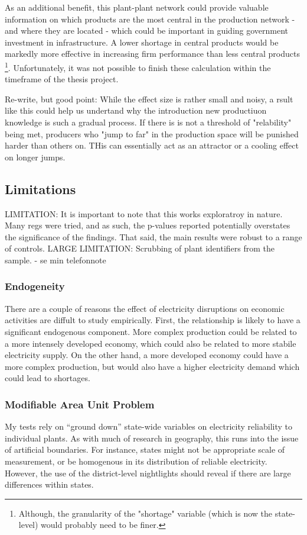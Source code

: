 \documentclass[11pt]{article}
\begin{document}
As an additional benefit, this plant-plant network could provide valuable information on which products are the most central in the production network - and where they are located - which could be important in guiding government investment in infrastructure. A lower shortage in central products would be markedly more effective in increasing firm performance than less central products \footnote{Although, the granularity of the "shortage" variable (which is now the state-level) would probably need to be finer.}. Unfortunately, it was not possible to finish these calculation within the timeframe of the thesis project.

Re-write, but good point:
While the effect size is rather small and noisy, a rsult like this could help us undertand why the introduction new productiuon knowledge is such a gradual process. If there is is not a threshold of "relability" being met, producers who "jump to far" in the production space will be punished harder than others on. THis can essentially act as an attractor or a cooling effect on longer jumps.

\subsection{Limitations}
\label{sec:org979560b}

LIMITATION: It is important to note that this works exploratroy in nature. Many regs were tried, and as such, the p-values reported potentially overstates the significance of the findings. That said, the main results were robust to a range of controls.
LARGE LIMITATION: Scrubbing of plant identifiers from the sample. - se min telefonnote

\subsubsection{Endogeneity}
\label{sec:orgd4457e7}
There are a couple of reasons the effect of electricity disruptions on economic activities are diffult to study empirically. First, the relationship is likely to have a significant endogenous component. More complex production could be related to a more intensely developed economy, which could also be related to more stabile electricity supply. On the other hand, a more developed economy could have a more complex production, but would also have a higher electricity demand which could lead to shortages.

\subsubsection{Modifiable Area Unit Problem}
\label{sec:org4e3cc26}
My tests rely on ``ground down'' state-wide variables on electricity reliability to individual plants. As with much of research in geography, this runs into the issue of artificial boundaries. For instance, states might not be appropriate scale of measurement, or be homogenous in its distribution of reliable electricity. However, the use of the district-level nightlights should reveal if there are large differences within states.
\end{document}
